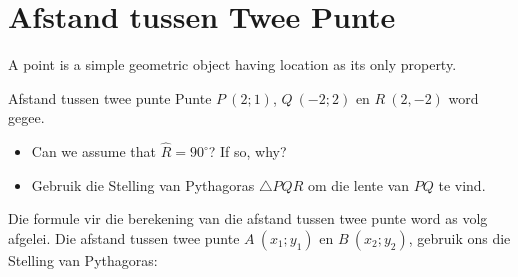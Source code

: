 \section{Afstand tussen Twee Punte}
A point is a simple geometric object having location as its only property. 


\begin{activity}{Afstand tussen twee punte}
Punte $P~(2;1)$, $Q~(-2;2)$ en $R~(2,-2)$ word gegee. 
\begin{itemize}
 \item Can we assume that $\hat{R}=90^{\circ}$? If so, why?
\item Gebruik die Stelling van Pythagoras $\triangle PQR$ om die lente van $PQ$ te vind.
\end{itemize}


\setcounter{subfigure}{0}
\begin{figure}[H] %
\begin{center}
\end{center}
\label{fig:trianglePQR}
\end{figure} 
\end{activity}       
%       
Die formule vir die berekening van die afstand tussen twee punte word as volg afgelei. Die afstand tussen twee
punte $A~({x}_{1};{y}_{1})$ en $B~({x}_{2};{y}_{2})$, gebruik ons die Stelling van Pythagoras:\par 

